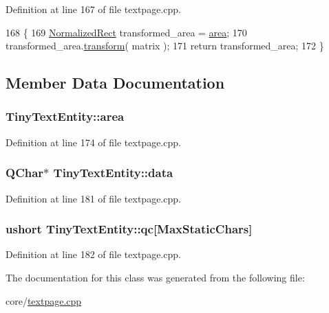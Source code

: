 Definition at line 167 of file textpage.\+cpp.


\begin{DoxyCode}
168         \{
169             \hyperlink{classOkular_1_1NormalizedRect}{NormalizedRect} transformed\_area = \hyperlink{classTinyTextEntity_a8b5dce783e679c307cfd36f67e2fb521}{area};
170             transformed\_area.\hyperlink{classOkular_1_1NormalizedRect_ae3bd6448865cb5b1f2b0fb8327d47e9b}{transform}( matrix );
171             \textcolor{keywordflow}{return} transformed\_area;
172         \}
\end{DoxyCode}


\subsection{Member Data Documentation}
\hypertarget{classTinyTextEntity_a8b5dce783e679c307cfd36f67e2fb521}{
\subsubsection[{area}]{ Tiny\+Text\+Entity\+::area}}\label{classTinyTextEntity_a8b5dce783e679c307cfd36f67e2fb521}


Definition at line 174 of file textpage.\+cpp.

\hypertarget{classTinyTextEntity_af65797303229cd43e06863b51916a6af}{
\subsubsection[{data}]{\setlength{\rightskip}{0pt plus 5cm}Q\+Char$\ast$ Tiny\+Text\+Entity\+::data}}\label{classTinyTextEntity_af65797303229cd43e06863b51916a6af}


Definition at line 181 of file textpage.\+cpp.

\hypertarget{classTinyTextEntity_a3a30dcf5d2436240002cd95ac1344a16}{
\subsubsection[{qc}]{\setlength{\rightskip}{0pt plus 5cm}ushort Tiny\+Text\+Entity\+::qc\mbox{[}Max\+Static\+Chars\mbox{]}}}\label{classTinyTextEntity_a3a30dcf5d2436240002cd95ac1344a16}


Definition at line 182 of file textpage.\+cpp.



The documentation for this class was generated from the following file\+:\begin{DoxyCompactItemize}
\item 
core/\hyperlink{textpage_8cpp}{textpage.\+cpp}\end{DoxyCompactItemize}
